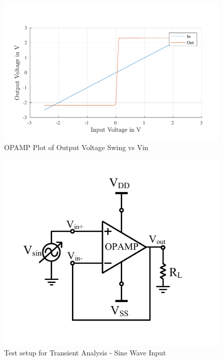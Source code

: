 \begin{figure} [H]
\centering
\includegraphics[scale=1]{Figures/Plots/OPAMP_OutSwing.pdf}
\caption{OPAMP Plot of Output Voltage Swing vs Vin}
\end{figure}

\begin{figure} [H]
\centering
\includegraphics[scale=1]{Figures/Test_Benches/OPAMP/OPAMP_Sine.pdf}
\caption{Test setup for Transient Analysis - Sine Wave Input}
\end{figure}

